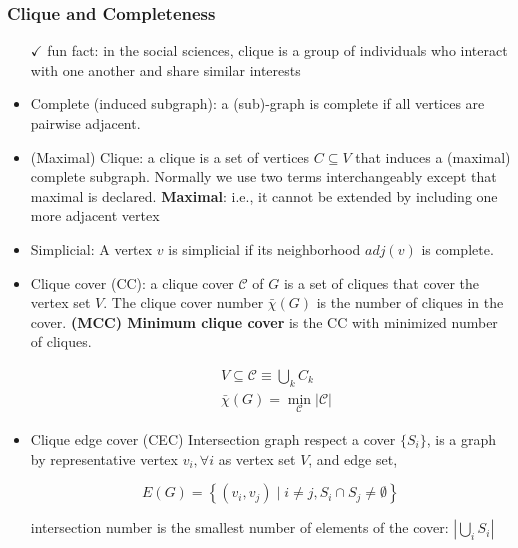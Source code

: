 \subsubsection*{Clique and Completeness}
\begin{itemize}
      \tightlist
      \item[\(\checkmark\)] fun fact: in the social sciences, clique is a group of individuals who interact with one another and share similar interests
      \item Complete (induced subgraph): a (sub)-graph is complete if all vertices are pairwise adjacent.
      \item (Maximal) Clique: a clique is a set of vertices \(C \subseteq V\) that induces a (maximal) complete subgraph. Normally we use two terms interchangeably except that maximal is declared. \textbf{Maximal}: i.e., it cannot be extended by including one more adjacent vertex
      \item Simplicial: A vertex \(v\) is simplicial if its neighborhood \(adj(v)\) is complete.
      \item Clique cover (CC): a clique cover \(\mathscr C\) of \(G\) is a set of
            cliques that cover the vertex set \(V\). The clique cover number
            \(\bar \chi (G)\) is the number of cliques in the cover. \textbf{(MCC) Minimum clique cover} is the CC with minimized number of cliques.

            \begin{equation}
                  \begin{aligned}
                         & V \subseteq \mathscr C \equiv \bigcup_k C_k    \\
                         & \bar \chi (G) = \min_{\mathscr C} |\mathscr C|
                  \end{aligned}
            \end{equation}
      \item Clique edge cover (CEC) Intersection graph respect a cover \(\{S_i\}\), is a graph by representative vertex \(v_i, \forall i\) as vertex set \(V\), and edge set,

            \[E(G)=\left\{(v_{i}, v_{j}) \mid i \neq j, S_{i} \cap S_{j} \neq \emptyset \right\}\]

            intersection number is the smallest number of elements of the cover: \(|\bigcup_i S_i|\)
\end{itemize}



